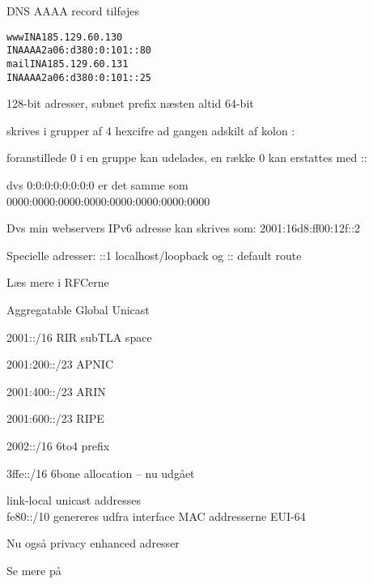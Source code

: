\documentclass[Screen16to9,17pt]{foils}
\begin{document}
\pause
DNS AAAA record tilføjes

\begin{alltt}
www     IN A    185.129.60.130
        IN AAAA 2a06:d380:0:101::80
mail    IN A    185.129.60.131
        IN AAAA 2a06:d380:0:101::25
\end{alltt}



\begin{list2}
\item 128-bit adresser, subnet prefix næsten altid 64-bit
\item skrives i grupper af 4 hexcifre ad gangen adskilt af kolon :
\item foranstillede 0 i en gruppe kan udelades, en række 0 kan erstattes med ::
\item dvs 0:0:0:0:0:0:0:0 er det samme som \\
0000:0000:0000:0000:0000:0000:0000:0000
\item Dvs min webservers IPv6 adresse kan skrives som:
2001:16d8:ff00:12f::2
\item Specielle adresser:
::1 localhost/loopback og
::  default route
\item Læs mere i RFCerne
\end{list2}


\begin{list1}
\item Aggregatable Global Unicast
\item 2001::/16 RIR subTLA space
\begin{list2}
\item 2001:200::/23 APNIC
\item 2001:400::/23 ARIN
\item 2001:600::/23 RIPE
\end{list2}
\item 2002::/16 6to4 prefix
\item 3ffe::/16 6bone allocation -- nu udgået
\item link-local unicast addresses\\
fe80::/10 genereres udfra interface MAC addresserne EUI-64
\item Nu også privacy enhanced adresser
\end{list1}

Se mere på 
\end{document}
